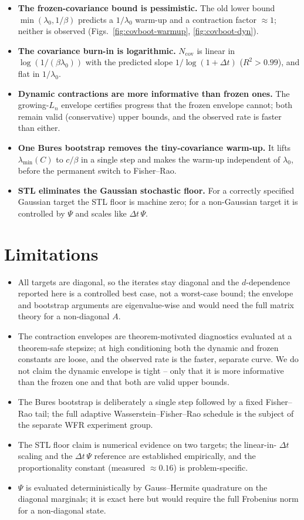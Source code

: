\documentclass[11pt]{article}
\newcommand{\Delt}{\Delta t}
\newcommand{\lammin}{\lambda_{\min}}
\newcommand{\Ncov}{N_{\mathrm{cov}}}
\begin{document}
\begin{itemize}
\item \textbf{The frozen-covariance bound is pessimistic.} The old lower bound
$\min(\lambda_0,1/\beta)$ predicts a $1/\lambda_0$ warm-up and a contraction
factor $\approx1$; neither is observed (Figs.~\ref{fig:covboot-warmup},
\ref{fig:covboot-dyn}).
\item \textbf{The covariance burn-in is logarithmic.} $\Ncov$ is linear in
$\log(1/(\beta\lambda_0))$ with the predicted slope $1/\log(1+\Delt)$
($R^2>0.99$), and flat in $1/\lambda_0$.
\item \textbf{Dynamic contractions are more informative than frozen ones.} The
growing-$L_n$ envelope certifies progress that the frozen envelope cannot; both
remain valid (conservative) upper bounds, and the observed rate is faster than
either.
\item \textbf{One Bures bootstrap removes the tiny-covariance warm-up.} It lifts
$\lammin(C)$ to $c/\beta$ in a single step and makes the warm-up independent of
$\lambda_0$, before the permanent switch to Fisher--Rao.
\item \textbf{STL eliminates the Gaussian stochastic floor.} For a correctly
specified Gaussian target the STL floor is machine zero; for a non-Gaussian target
it is controlled by $\Psi$ and scales like $\Delt\,\Psi$.
\end{itemize}

\section{Limitations}
\label{sec:limitations}

\begin{itemize}
\item All targets are diagonal, so the iterates stay diagonal and the
$d$-dependence reported here is a controlled best case, not a worst-case bound;
the envelope and bootstrap arguments are eigenvalue-wise and would need the full
matrix theory for a non-diagonal $A$.
\item The contraction envelopes are theorem-motivated diagnostics evaluated at a
theorem-safe stepsize; at high conditioning both the dynamic and frozen constants
are loose, and the observed rate is the faster, separate curve. We do not claim
the dynamic envelope is tight -- only that it is more informative than the frozen
one and that both are valid upper bounds.
\item The Bures bootstrap is deliberately a single step followed by a fixed
Fisher--Rao tail; the full adaptive Wasserstein--Fisher--Rao schedule is the
subject of the separate WFR experiment group.
\item The STL floor claim is numerical evidence on two targets; the linear-in-%
$\Delt$ scaling and the $\Delt\,\Psi$ reference are established empirically, and
the proportionality constant (measured $\approx0.16$) is problem-specific.
\item $\Psi$ is evaluated deterministically by Gauss--Hermite quadrature on the
diagonal marginals; it is exact here but would require the full Frobenius norm for
a non-diagonal state.
\end{itemize}
\end{document}
